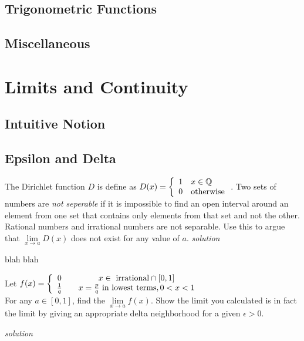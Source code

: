 \documentclass{amsbook}
\begin{document}
\section{Trigonometric Functions}


\section{Miscellaneous}

\chapter{Limits and Continuity}


\section{Intuitive Notion}

\section{Epsilon and Delta}

\begin{Exercise}[title={Dirichlet Function}, difficulty=1 , label=2b1 ]
	The Dirichlet function $D$ is define as $D(x)=\left\{\begin{array}{c l} 1 & x\in \mathbb{Q} \\ 0 & \mbox{otherwise}\end{array} \right.$. Two sets of numbers are \emph{not seperable} if it is impossible to find an open interval around an element from one set that contains only elements from that set and not the other. Rational numbers and irrational numbers are not separable. Use this  to argue that $\lim \limits_{x\to a} D(x)$ does not exist for any value of $a$.
	\hfill \emph{solution} 
\end{Exercise}

\begin{Answer}[ref={2b1}]
	blah blah
\end{Answer}

\begin{Exercise}[title={A Strange Function}, difficulty=3, label=2b2]
	Let $f(x)=\left\{ \begin{array}{c c} 0 & \quad x \in \mbox{ irrational} \cap [0,1] \\
	\frac{1}{q} & \quad x=\frac{p}{q} \mbox{ in lowest terms}, 0<x<1 \end{array} \right.$ \\[.5cm]
	For any $a \in [0,1]$, find the $\lim \limits_{x \to a} f(x)$. Show the limit you calculated is in fact the limit by giving an appropriate delta neighborhood for a given $\epsilon >0$. \textcite{spk}

\hfill \emph{solution} 
\end{Exercise}
\end{document}
